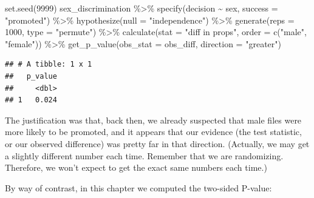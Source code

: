 \documentclass[
]{book}
\newenvironment{Shaded}{\begin{snugshade}}{\end{snugshade}}
\newcommand{\AttributeTok}[1]{\textcolor[rgb]{0.77,0.63,0.00}{#1}}
\newcommand{\DecValTok}[1]{\textcolor[rgb]{0.00,0.00,0.81}{#1}}
\newcommand{\FunctionTok}[1]{\textcolor[rgb]{0.00,0.00,0.00}{#1}}
\newcommand{\NormalTok}[1]{#1}
\newcommand{\SpecialCharTok}[1]{\textcolor[rgb]{0.00,0.00,0.00}{#1}}
\newcommand{\StringTok}[1]{\textcolor[rgb]{0.31,0.60,0.02}{#1}}
\begin{document}
\begin{Shaded}
\begin{Highlighting}[]
\FunctionTok{set.seed}\NormalTok{(}\DecValTok{9999}\NormalTok{)}
\NormalTok{sex\_discrimination }\SpecialCharTok{\%\textgreater{}\%}
    \FunctionTok{specify}\NormalTok{(decision }\SpecialCharTok{\textasciitilde{}}\NormalTok{ sex, }\AttributeTok{success =} \StringTok{"promoted"}\NormalTok{) }\SpecialCharTok{\%\textgreater{}\%}
    \FunctionTok{hypothesize}\NormalTok{(}\AttributeTok{null =} \StringTok{"independence"}\NormalTok{) }\SpecialCharTok{\%\textgreater{}\%}
    \FunctionTok{generate}\NormalTok{(}\AttributeTok{reps =} \DecValTok{1000}\NormalTok{, }\AttributeTok{type =} \StringTok{"permute"}\NormalTok{) }\SpecialCharTok{\%\textgreater{}\%}
    \FunctionTok{calculate}\NormalTok{(}\AttributeTok{stat =} \StringTok{"diff in props"}\NormalTok{, }\AttributeTok{order =} \FunctionTok{c}\NormalTok{(}\StringTok{"male"}\NormalTok{, }\StringTok{"female"}\NormalTok{)) }\SpecialCharTok{\%\textgreater{}\%}
    \FunctionTok{get\_p\_value}\NormalTok{(}\AttributeTok{obs\_stat =}\NormalTok{ obs\_diff, }\AttributeTok{direction =} \StringTok{"greater"}\NormalTok{)}
\end{Highlighting}
\end{Shaded}

\begin{verbatim}
## # A tibble: 1 x 1
##   p_value
##     <dbl>
## 1   0.024
\end{verbatim}

The justification was that, back then, we already suspected that male files were more likely to be promoted, and it appears that our evidence (the test statistic, or our observed difference) was pretty far in that direction. (Actually, we may get a slightly different number each time. Remember that we are randomizing. Therefore, we won't expect to get the exact same numbers each time.)

By way of contrast, in this chapter we computed the two-sided P-value:
\end{document}
